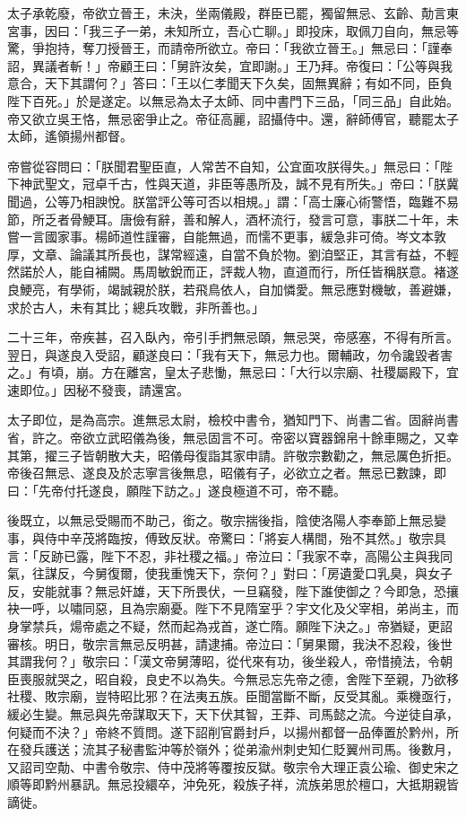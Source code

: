 \begin{pinyinscope}
 太子承乾廢，帝欲立晉王，未決，坐兩儀殿，群臣已罷，獨留無忌、玄齡、勣言東宮事，因曰：「我三子一弟，未知所立，吾心亡聊。」即投床，取佩刀自向，無忌等驚，爭抱持，奪刀授晉王，而請帝所欲立。帝曰：「我欲立晉王。」無忌曰：「謹奉詔，異議者斬！」帝顧王曰：「舅許汝矣，宜即謝。」王乃拜。帝復曰：「公等與我意合，天下其謂何？」答曰：「王以仁孝聞天下久矣，固無異辭；有如不同，臣負陛下百死。」於是遂定。以無忌為太子太師、同中書門下三品，「同三品」自此始。帝又欲立吳王恪，無忌密爭止之。帝征高麗，詔攝侍中。還，辭師傅官，聽罷太子太師，遙領揚州都督。



 帝嘗從容問曰：「朕聞君聖臣直，人常苦不自知，公宜面攻朕得失。」無忌曰：「陛下神武聖文，冠卓千古，性與天道，非臣等愚所及，誠不見有所失。」帝曰：「朕冀聞過，公等乃相諛悅。朕當評公等可否以相規。」謂：「高士廉心術警悟，臨難不易節，所乏者骨鯁耳。唐儉有辭，善和解人，酒杯流行，發言可意，事朕二十年，未嘗一言國家事。楊師道性謹審，自能無過，而懦不更事，緩急非可倚。岑文本敦厚，文章、論議其所長也，謀常經遠，自當不負於物。劉洎堅正，其言有益，不輕然諾於人，能自補闕。馬周敏銳而正，評裁人物，直道而行，所任皆稱朕意。褚遂良鯁亮，有學術，竭誠親於朕，若飛鳥依人，自加憐愛。無忌應對機敏，善避嫌，求於古人，未有其比；總兵攻戰，非所善也。」



 二十三年，帝疾甚，召入臥內，帝引手捫無忌頤，無忌哭，帝感塞，不得有所言。翌日，與遂良入受詔，顧遂良曰：「我有天下，無忌力也。爾輔政，勿令讒毀者害之。」有頃，崩。方在離宮，皇太子悲慟，無忌曰：「大行以宗廟、社稷屬殿下，宜速即位。」因秘不發喪，請還宮。



 太子即位，是為高宗。進無忌太尉，檢校中書令，猶知門下、尚書二省。固辭尚書省，許之。帝欲立武昭儀為後，無忌固言不可。帝密以寶器錦帛十餘車賜之，又幸其第，擢三子皆朝散大夫，昭儀母復詣其家申請。許敬宗數勸之，無忌厲色折拒。帝後召無忌、遂良及於志寧言後無息，昭儀有子，必欲立之者。無忌已數諫，即曰：「先帝付托遂良，願陛下訪之。」遂良極道不可，帝不聽。



 後既立，以無忌受賜而不助己，銜之。敬宗揣後指，陰使洛陽人李奉節上無忌變事，與侍中辛茂將臨按，傅致反狀。帝驚曰：「將妄人構間，殆不其然。」敬宗具言：「反跡已露，陛下不忍，非社稷之福。」帝泣曰：「我家不幸，高陽公主與我同氣，往謀反，今舅復爾，使我重愧天下，奈何？」對曰：「房遺愛口乳臭，與女子反，安能就事？無忌奸雄，天下所畏伏，一旦竊發，陛下誰使御之？今即急，恐攘袂一呼，以嘯同惡，且為宗廟憂。陛下不見隋室乎？宇文化及父宰相，弟尚主，而身掌禁兵，煬帝處之不疑，然而起為戎首，遂亡隋。願陛下決之。」帝猶疑，更詔審核。明日，敬宗言無忌反明甚，請逮捕。帝泣曰：「舅果爾，我決不忍殺，後世其謂我何？」敬宗曰：「漢文帝舅薄昭，從代來有功，後坐殺人，帝惜撓法，令朝臣喪服就哭之，昭自殺，良史不以為失。今無忌忘先帝之德，舍陛下至親，乃欲移社稷、敗宗廟，豈特昭比邪？在法夷五族。臣聞當斷不斷，反受其亂。乘機亟行，緩必生變。無忌與先帝謀取天下，天下伏其智，王莽、司馬懿之流。今逆徒自承，何疑而不決？」帝終不質問。遂下詔削官爵封戶，以揚州都督一品俸置於黔州，所在發兵護送；流其子秘書監沖等於嶺外；從弟渝州刺史知仁貶翼州司馬。後數月，又詔司空勣、中書令敬宗、侍中茂將等覆按反獄。敬宗令大理正袁公瑜、御史宋之順等即黔州暴訊。無忌投繯卒，沖免死，殺族子祥，流族弟思於檀口，大抵期親皆謫徙。




\end{pinyinscope}
